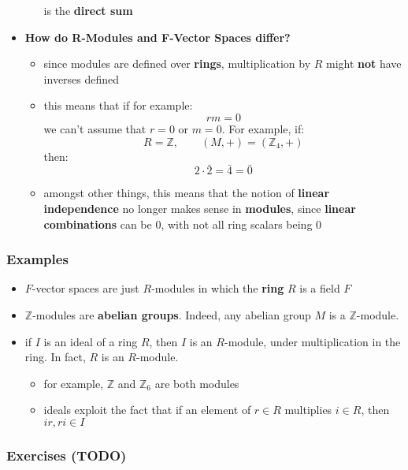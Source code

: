 \documentclass{exam}
\begin{document}
\begin{itemize}
\begin{itemize}
\[        \]
        is the \textbf{direct sum}
    \end{itemize}
    \item \textbf{How do R-Modules and F-Vector Spaces differ?}
    \begin{itemize}
        \item since modules are defined over \textbf{rings}, multiplication by $R$ might \textbf{not} have inverses defined
        \item this means that if for example:
        \[
        rm = 0
        \]
        we can't assume that $r = 0$ or $m = 0$. For example, if:
        \[
        R = \mathbb{Z}, \qquad (M,+) = (\mathbb{Z}_4, +)
        \]
        then:
        \[
        2 \cdot \bar{2} = \bar{4} = \bar{0}
        \]
        \item amongst other things, this means that the notion of \textbf{linear independence} no longer makes sense in \textbf{modules}, since \textbf{linear combinations} can be 0, with not all ring scalars being 0
    \end{itemize}
\end{itemize}

\subsubsection{Examples}

\begin{itemize}
    \item $F$-vector spaces are just $R$-modules in which the \textbf{ring} $R$ is a field $F$
    \item $\mathbb{Z}$-modules are \textbf{abelian groups}. Indeed, any abelian group $M$ is a $\mathbb{Z}$-module.
    \item if $I$ is an ideal of a ring $R$, then $I$ is an $R$-module, under multiplication in the ring. In fact, $R$ is an $R$-module.
    \begin{itemize}
        \item for example, $\mathbb{Z}$ and $\mathbb{Z}_6$ are both modules
        \item ideals exploit the fact that if an element of $r \in R$ multiplies $i \in R$, then $ir, ri \in I$
    \end{itemize}
\end{itemize}

\subsubsection{Exercises (TODO)}
\end{document}
